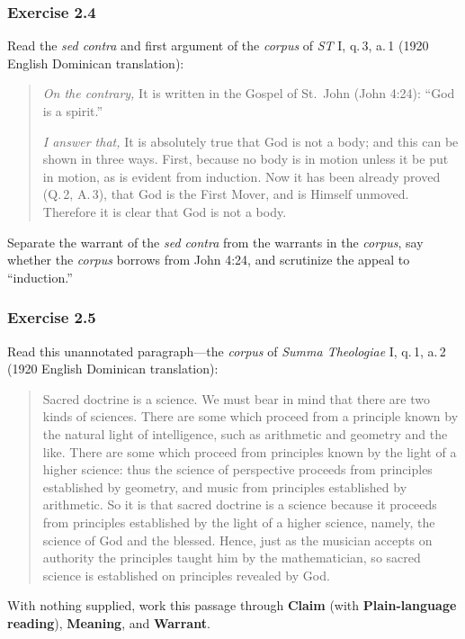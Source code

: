 \subsubsection*{Exercise 2.4}
Read the \emph{sed contra} and first argument of the \emph{corpus} of \emph{ST} I, q.\,3, a.\,1 (1920 English Dominican translation):

\begin{quote}
\emph{On the contrary,} It is written in the Gospel of St.\ John (John 4:24): ``God is a spirit.''

\emph{I answer that,} It is absolutely true that God is not a body; and this can be shown in three ways. First, because no body is in motion unless it be put in motion, as is evident from induction. Now it has been already proved (Q.\,2, A.\,3), that God is the First Mover, and is Himself unmoved. Therefore it is clear that God is not a body.
\end{quote}

Separate the warrant of the \emph{sed contra} from the warrants in the \emph{corpus}, say whether the \emph{corpus} borrows from John 4:24, and scrutinize the appeal to ``induction.''

\subsubsection*{Exercise 2.5}
Read this unannotated paragraph---the \emph{corpus} of \emph{Summa Theologiae} I, q.\,1, a.\,2 (1920 English Dominican translation):

\begin{quote}
Sacred doctrine is a science. We must bear in mind that there are two kinds of sciences. There are some which proceed from a principle known by the natural light of intelligence, such as arithmetic and geometry and the like. There are some which proceed from principles known by the light of a higher science: thus the science of perspective proceeds from principles established by geometry, and music from principles established by arithmetic. So it is that sacred doctrine is a science because it proceeds from principles established by the light of a higher science, namely, the science of God and the blessed. Hence, just as the musician accepts on authority the principles taught him by the mathematician, so sacred science is established on principles revealed by God.
\end{quote}

With nothing supplied, work this passage through \textbf{Claim} (with \textbf{Plain-language reading}), \textbf{Meaning}, and \textbf{Warrant}.

